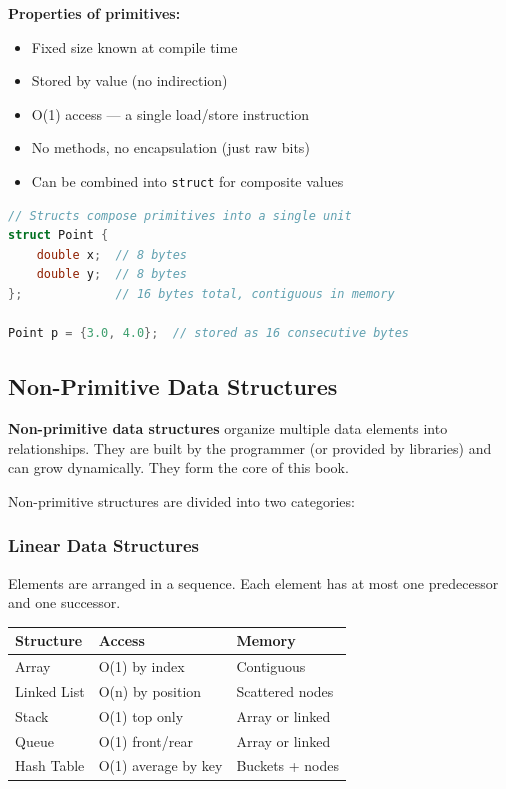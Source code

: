 \textbf{Properties of primitives:}
\begin{itemize}
\item Fixed size known at compile time
\item Stored by value (no indirection)
\item O(1) access — a single load/store instruction
\item No methods, no encapsulation (just raw bits)
\item Can be combined into \texttt{struct} for composite values
\end{itemize}

\begin{lstlisting}[language=C++]
// Structs compose primitives into a single unit
struct Point {
    double x;  // 8 bytes
    double y;  // 8 bytes
};             // 16 bytes total, contiguous in memory

Point p = {3.0, 4.0};  // stored as 16 consecutive bytes
\end{lstlisting}

\subsection{Non-Primitive Data Structures}

\textbf{Non-primitive data structures} organize multiple data elements into relationships. They are built by the programmer (or provided by libraries) and can grow dynamically. They form the core of this book.

Non-primitive structures are divided into two categories:

\subsubsection{Linear Data Structures}

Elements are arranged in a sequence. Each element has at most one predecessor and one successor.

\begin{center}
\begin{tabular}{lll}
\toprule
Structure & Access & Memory \\
\midrule
Array & O(1) by index & Contiguous \\
Linked List & O(n) by position & Scattered nodes \\
Stack\index{stack} & O(1) top only & Array or linked \\
Queue & O(1) front/rear & Array or linked \\
Hash Table & O(1) average by key & Buckets + nodes \\
\bottomrule
\end{tabular}
\end{center}

